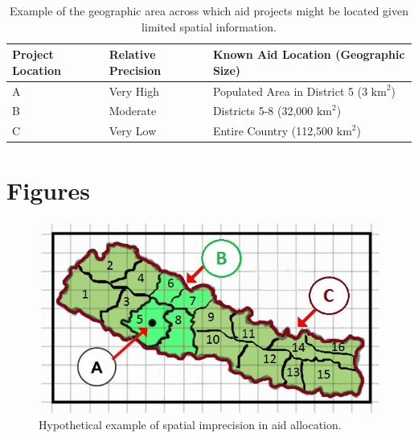 \documentclass[11pt]{article}
\begin{document}
\newpage
\begin{table}[!htbp]
	\begin{tabular}{| l | l | l |}
	\hline
	Project Location & Relative Precision & Known Aid Location (Geographic Size)\\
    \hline
    A &  Very High & Populated Area in District 5 (3 $\text{km}^2$) \\ \hline
    B &  Moderate & Districts 5-8 (32,000 $\text{km}^2$) \\ \hline
    C &  Very Low & Entire Country (112,500 $\text{km}^2$) \\ \hline
	\end{tabular}
	\caption{Example of the geographic area across which aid projects might be located given limited spatial information.}\label{precision_example}
\end{table}
\newpage

\section{Figures}

\begin{figure}[!htbp]
\includegraphics{nepal_ex}
\caption{Hypothetical example of spatial imprecision in aid allocation.}\label{fig:nepalex}
\end{figure}
\end{document}
